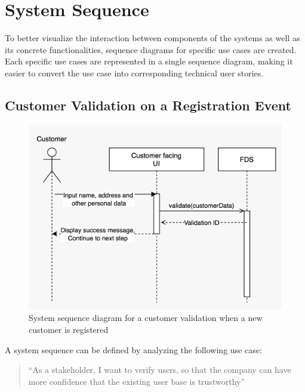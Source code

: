 \section{System Sequence}
 \label{section:sequence}
 
To better visualize the interaction between components of the systems as well as its concrete functionalities, sequence diagrams for specific use cases are created. Each specific use cases are represented in a single sequence diagram, making it easier to convert the use case into corresponding technical user stories.

\subsection{Customer Validation on a Registration Event}
 \label{subsection:regis}

\begin{figure}[!ht]
 \includegraphics[width=\textwidth]{diagrams/sequence_registration.jpeg}
 \caption{System sequence diagram for a customer validation when a new customer is registered}
\end{figure}

A system sequence can be defined by analyzing the following use case:

\begin{quotation}
 \enquote{As a stakeholder, I want to verify users, so that the company can have more confidence that the existing user base is trustworthy} 
\end{quotation}

